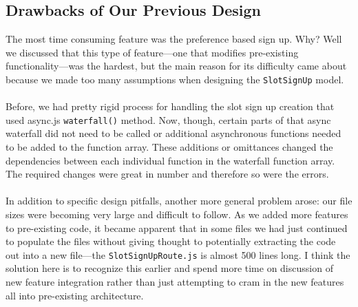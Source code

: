 \documentclass[11pt]{article}   %
\begin{document}
\subsection{Drawbacks of Our Previous Design}
The most time consuming feature was the preference based sign up. Why? Well we discussed that this type of feature---one that modifies pre-existing functionality---was the hardest, but the main reason for its difficulty came about because we made too many assumptions when designing the \texttt{SlotSignUp} model.\\~\\
Before, we had pretty rigid process for handling the slot sign up creation that used async.js \texttt{waterfall()} method. Now, though, certain parts of that async waterfall did not need to be called or additional asynchronous functions needed to be added to the function array. These additions or omittances changed the dependencies between each individual function in the waterfall function array. The required changes were great in number and therefore so were the errors. \\~\\
In addition to specific design pitfalls, another more general problem arose: our file sizes were becoming very large and difficult to follow. As we added more features to pre-existing code, it became apparent that in some files we had just continued to populate the files without giving thought to potentially extracting the code out into a new file---the \texttt{SlotSignUpRoute.js} is almost 500 lines long. I think the solution here is to recognize this earlier and spend more time on discussion of new feature integration rather than just attempting to cram in the new features all into pre-existing architecture. 
\end{document}
